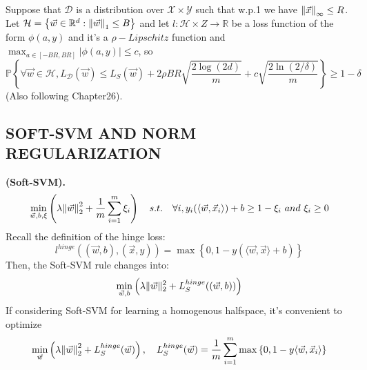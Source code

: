 \begin{theorem}
    Suppose that $ \mathcal{D} $ is a distribution over $ \mathcal{X}\times \mathcal{Y} $ such that w.p.1 we have
    $ {\Arrowvert \vec{x}  \Arrowvert}_\infty \le R $. Let $ \mathcal{H} = \left\{ \vec{w} \in \mathbb{R}^d : {\Arrowvert \vec{w}  \Arrowvert}_1 \le B \right\} $ and let $ l: \mathcal{H} \times Z \rightarrow \mathbb{R} $ be a loss function of the form $ \phi(a,y) $ and it's a $ \rho-Lipschitz $ function and $ \max_{a \in [-BR, BR]} \left| \phi(a, y) \right| \le c$, so
    \[
    \mathbb{P} \left\{ \forall \vec{w} \in \mathcal{H}, L_{ \mathcal{D} }( \vec{w} )
    \le L_S( \vec{w} ) + 2 \rho BR \sqrt{ \frac{2\log(2d)}{m} }+ c \sqrt{ \frac{2 \ln(2/\delta)}{m} }\right\}
    \ge 1 - \delta
    \]
    (Also following Chapter26).
\end{theorem}

\subsection{SOFT-SVM AND NORM REGULARIZATION}%
\label{sub:soft_svm_and_norm_regularization}

\begin{definition}
    \textbf{(Soft-SVM).}
    \[
        \min_{ \vec{w}, b, \xi} \left( \lambda {\Arrowvert \vec{w}  \Arrowvert}_2^2 + \frac{1}{m} \sum^{m}_{i=1} \xi_i \right) \quad
        s.t.\quad \forall i, y_i ( \langle \vec{w} , \vec{x} _i \rangle) + b \ge 1- \xi_i\ and\ \xi_i \ge 0
    \]
    Recall the definition of the hinge loss:
    \[
        l^{hinge} (( \vec{w} , b), ( \vec{x} , y) )  = \max \left\{ 0, 1 - y( \langle \vec{w} , \vec{x} \rangle + b) \right\}
    \]
    Then, the Soft-SVM rule changes into:
    \[
        \min_{ \vec{w}, b} \left( \lambda \Arrowvert \vec{w}  \Arrowvert^2_2 + L^{hinge}_S(( \vec{w}, b)) \right)
    \]
    If considering Soft-SVM for learning a homogenous halfspace, it's convenient to optimize
    \[
        \min_{ \vec{w} } \left( \lambda {\Arrowvert \vec{w}  \Arrowvert}_2^2 + L^{hinge}_S( \vec{w} ) \right),
        \quad
        L^{hinge}_S( \vec{w} ) = \frac{1}{m} \sum^{m}_{i=1} \max \left\{ 0, 1- y \langle \vec{w}, \vec{x}_i \rangle \right\}
    \]
\end{definition}
